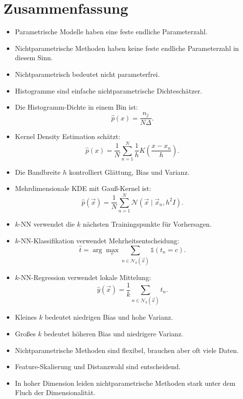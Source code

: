 \section{Zusammenfassung}

\begin{itemize}
    \item Parametrische Modelle haben eine feste endliche Parameterzahl.
    \item Nichtparametrische Methoden haben keine feste endliche Parameterzahl in diesem Sinn.
    \item Nichtparametrisch bedeutet nicht parameterfrei.
    \item Histogramme sind einfache nichtparametrische Dichteschätzer.
    \item Die Histogramm-Dichte in einem Bin ist:
    \[
        \hat{p}(x)
        =
        \frac{n_j}{N\Delta}.
    \]
    \item Kernel Density Estimation schätzt:
    \[
        \hat{p}(x)
        =
        \frac{1}{N}
        \sum_{n=1}^{N}
        \frac{1}{h}
        K
        \left(
            \frac{x-x_n}{h}
        \right).
    \]
    \item Die Bandbreite \(h\) kontrolliert Glättung, Bias und Varianz.
    \item Mehrdimensionale KDE mit Gauß-Kernel ist:
    \[
        \hat{p}(\vec{x})
        =
        \frac{1}{N}
        \sum_{n=1}^{N}
        \mathcal{N}(\vec{x}\mid\vec{x}_n,h^2I).
    \]
    \item \(k\)-NN verwendet die \(k\) nächsten Trainingspunkte für Vorhersagen.
    \item \(k\)-NN-Klassifikation verwendet Mehrheitsentscheidung:
    \[
        \hat{t}
        =
        \arg\max_c
        \sum_{n\in\mathcal{N}_k(\vec{x})}
        \mathbb{1}(t_n=c).
    \]
    \item \(k\)-NN-Regression verwendet lokale Mittelung:
    \[
        \hat{y}(\vec{x})
        =
        \frac{1}{k}
        \sum_{n\in\mathcal{N}_k(\vec{x})}
        t_n.
    \]
    \item Kleines \(k\) bedeutet niedrigen Bias und hohe Varianz.
    \item Großes \(k\) bedeutet höheren Bias und niedrigere Varianz.
    \item Nichtparametrische Methoden sind flexibel, brauchen aber oft viele Daten.
    \item Feature-Skalierung und Distanzwahl sind entscheidend.
    \item In hoher Dimension leiden nichtparametrische Methoden stark unter dem Fluch der Dimensionalität.
\end{itemize}

